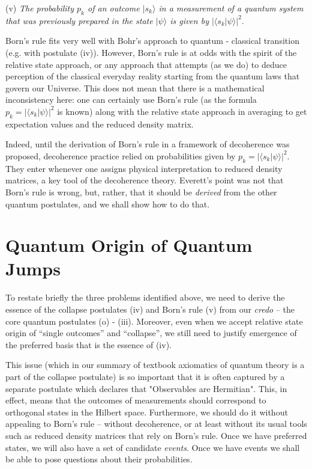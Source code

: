\documentclass[aps,amsmath,amssymb,amsfonts,floatfix]{revtex4-1}
\newcommand{\ket}[1]    {| #1 \rangle}
\newcommand{\bk}[2]     {\langle #1 | #2 \rangle}
\newcommand{\+}         {\dagger}
\begin{document}
(v) {\it The probability $p_k$ of an outcome $\ket {s_k}$ in a measurement of a quantum system that was
previously prepared in the state $\ket \psi$ is given by $|\bk {s_k} \psi |^2$}.

Born's rule fits very well with Bohr's approach to quantum - classical transition (e.g.
with postulate (iv)). However, Born's rule is at odds with the spirit of the relative state
approach, or any approach that attempts (as we do) to deduce perception of the classical everyday reality starting from the quantum laws that govern our Universe. This does not mean that there is a mathematical inconsistency here: one can certainly
use Born's rule (as the formula $p_k= |\bk {s_k} \psi |^2$ is known) along with the relative state
approach in averaging to get expectation values and the reduced density matrix. 

Indeed, until the derivation of Born's rule in a framework of decoherence was proposed, 
decoherence practice relied on probabilities given by $p_k= |\bk {s_k} \psi |^2$. They enter whenever one assigns physical interpretation to reduced density matrices, a key tool of the decoherence theory. Everett's point was not that Born's rule is wrong, but,
rather, that it should be {\it derived} from the other quantum postulates, and we shall show how to do that. 

\section{Quantum Origin of Quantum Jumps}

To restate briefly the three problems identified above, we
need to derive the essence of the collapse postulates (iv)
and Born's rule (v) from our {\it credo} -- the core quantum postulates (o) - (iii).  Moreover, even when we accept relative
state origin of ``single outcomes'' and ``collapse'', we still need to justify emergence of the preferred basis that is
the essence of (iv). 

This issue (which in our summary of textbook axiomatics of quantum theory is a part of the collapse postulate) is so important that it is often captured by a separate postulate which declares that "Observables are Hermitian". This, in effect, means that the outcomes of measurements should correspond to orthogonal states in the Hilbert space. Furthermore, we should do it without appealing to Born's rule
-- without decoherence, or at least without its usual tools such as reduced density matrices that rely on Born's rule. Once we have preferred states, we will also have a set
of candidate {\it events}.  Once we have events we shall be able to pose questions about their probabilities.
\end{document}
